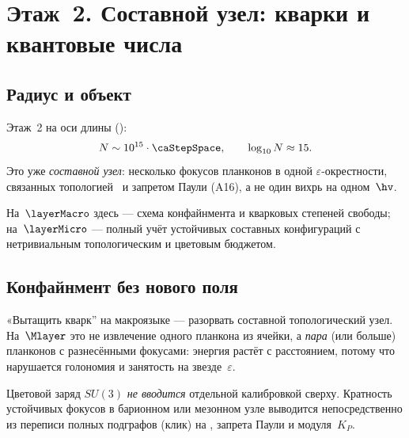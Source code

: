 \chapter{Этаж~2. Составной узел: кварки и квантовые числа}
\label{ch:floor2}

\section{Радиус и объект}
\label{sec:floor2-scale}

Этаж~2 на оси длины ():
\[
  N\sim 10^{15}\cdot\caStepSpace,\qquad \log_{10}N\approx 15.
\]
Это уже \emph{составной узел}: несколько фокусов планконов в одной $\varepsilon$-окрестности,
связанных топологией \latGCKshort\ и запретом Паули (A16), а не один вихрь на одном~$\hv$.

На~$\layerMacro$ здесь --- схема конфайнмента и кварковых степеней свободы;
на~$\layerMicro$ --- полный учёт устойчивых составных конфигураций с нетривиальным
топологическим и цветовым бюджетом.

\section{Конфайнмент без нового поля}
\label{sec:floor2-confinement}

«Вытащить кварк'' на макроязыке --- разорвать составной топологический узел.
На~$\Mlayer$ это не извлечение одного планкона из ячейки, а
\emph{пара} (или больше) планконов с разнесёнными фокусами:
энергия растёт с расстоянием, потому что нарушается голономия и занятость на звезде~$\varepsilon$.

Цветовой заряд $SU(3)$ \emph{не вводится} отдельной калибровкой сверху.
Кратность устойчивых фокусов в барионном или мезонном узле
выводится непосредственно из переписи полных подграфов (клик) на \latGCKshort,
запрета Паули и модуля~$K_P$.

